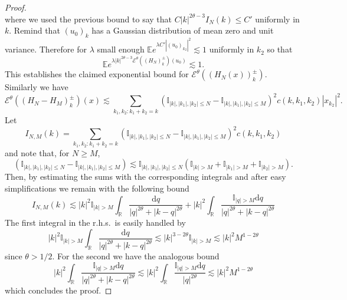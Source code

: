 \documentclass[11pt,a4paper,draft,reqno]{amsart}
\newcommand{\II}{\mathbb{I}}
\newcommand{\RR}{\mathbb{R}}
\newcommand{\expect}{\mathbb{E}}
\newcommand{\cE}{\mathcal{E}}
\newcommand{\dd}{\mathrm{d}}
\begin{document}
\begin{proof}
$$$$
where we used the previous bound to say that $C|k|^{2\theta-3} I_N(k) \le C'$ uniformly in $k$. Remind that $(u_0)_k$ has a Gaussian distribution of mean zero and unit variance. Therefore for $\lambda$ small enough $\expect e^{\lambda C'|(u_0)_{k_2}|^2}\lesssim 1$ uniformly in $k_2$ so that  
$$
\expect e^{\lambda |k|^{2\theta-3}\cE^\theta((H_N)^\pm_k)(u_0)} \lesssim 1.
$$
This establishes the claimed exponential bound for $\cE^\theta((H_N(x))_k^\pm)$. 
Similarly we have
$$
\cE^\theta((H_N-H_M)^\pm_k)(x)  \lesssim \sum_{k_1,k_2 :k_1+k_2=k} (\II_{|k|,|k_1|,|k_2|\le N}-\II_{|k|,|k_1|,|k_2|\le M})^2 c(k,k_1,k_2) | x_{k_2}|^2 .
 $$
Let
$$
I_{N,M}(k) =\sum_{k_1,k_2 :k_1+k_2=k} (\II_{|k|,|k_1|,|k_2|\le N}-\II_{|k|,|k_1|,|k_2|\le M})^2 c(k,k_1,k_2)
$$
and note that, for $N\ge M$,
$$
(\II_{|k|,|k_1|,|k_2|\le N}-\II_{|k|,|k_1|,|k_2|\le M}) \lesssim \II_{|k|,|k_1|,|k_2|\le N}(\II_{|k|> M}+\II_{|k_1|> M}+\II_{|k_2|> M}).
$$
Then, by estimating the sums with the corresponding integrals and after easy simplifications we remain with the following bound
$$
I_{N,M}(k)\lesssim |k|^{2} \II_{|k|> M} \int_{\RR} \frac{\dd q}{|q|^{2\theta}+|k-q|^{2\theta}} 
+ |k|^{2}  \int_{\RR} \frac{\II_{|q|> M}\dd q}{|q|^{2\theta}+|k-q|^{2\theta}} 
$$
The first integral in the r.h.s.~is easily handled by
$$
|k|^{2} \II_{|k|> M} \int_{\RR} \frac{\dd q}{|q|^{2\theta}+|k-q|^{2\theta}} \lesssim |k|^{3-2\theta} \II_{|k|> M} \lesssim |k|^2 M^{1-2\theta}
$$
since $\theta > 1/2$. For the second we have the analogous bound
$$
|k|^{2}  \int_{\RR} \frac{\II_{|q|> M}\dd q}{|q|^{2\theta}+|k-q|^{2\theta}} \lesssim 
|k|^{2}  \int_{\RR} \frac{\II_{|q|> M}\dd q}{|q|^{2\theta}} \lesssim |k|^2 M^{1-2\theta}
$$
which concludes the proof.
\end{proof}
\end{document}
